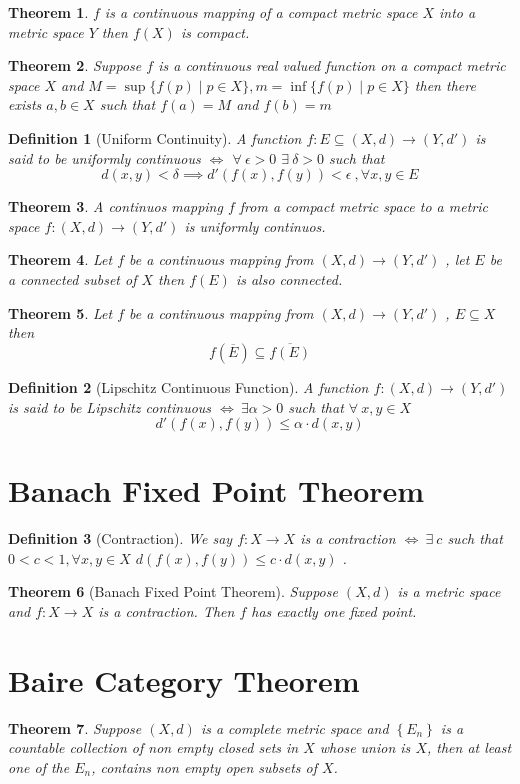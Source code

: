\documentclass{article}
\newcommand{\set}[1]{\left\{#1\right\}}
\newtheorem{theorem}{Theorem}[section]
\newtheorem{defn}{Definition}[section]
\begin{document}
\begin{theorem}
	$f$ is a continuous mapping of a compact metric space $X$ into a metric space $Y$ then $f(X)$ is compact.
\end{theorem}
\begin{theorem}
	Suppose $f$ is a continuous real valued function on a compact metric space $X$ and $M=\sup\{f(p)\mid p\in X\},m=\inf\{f(p)\mid p\in X\}$ then there exists $a,b\in X$ such that $f(a)=M$ and $f(b)=m$
\end{theorem}
\begin{defn}[Uniform Continuity]
	A function $f:E\subseteq(X,d)\to(Y,d')$ is said to be uniformly continuous $\iff$ $\forall \ \epsilon>0$ $\exists \ \delta>0$ such that 
	\[d(x,y)<\delta \implies d'(f(x),f(y))<\epsilon \ ,\forall x,y\in E\]
\end{defn}
\begin{theorem}
	A continuos mapping $f$ from  a compact metric space to a metric space $f:(X,d)\to (Y,d')$ is uniformly continuos.
\end{theorem}
\begin{theorem}
	Let $f$ be a continuous mapping from $(X,d)\to(Y,d')$ , let $E$ be a connected subset of $X$ then $f(E)$ is also connected.
	 
	
\end{theorem}
\begin{theorem}
		Let $f$ be a continuous mapping from $(X,d)\to(Y,d')$ , $E\subseteq X$ then 
		\[f(\overline{E})\subseteq \overline{f(E)}\]
\end{theorem}
\begin{defn}[Lipschitz Continuous Function]
	A function $f:(X,d)\to(Y,d')$ is said to be Lipschitz continuous $\iff\ \exists\alpha>0$ such  that $\forall \ x,y\in X$
	\[d'(f(x),f(y))\leq \alpha \cdot d(x,y)\] 
\end{defn}
\section{Banach Fixed Point Theorem}
\begin{defn}[Contraction]
	We say $f:X\to X$ is a contraction $\iff \ \exists \  c $ such that $ 0<c<1,\forall x,y \in X$ $d(f(x),f(y))\leq c \cdot d(x,y)$ .
\end{defn}
\begin{theorem}[Banach Fixed Point Theorem]
	Suppose $(X,d)$ is a metric space and $f:X\to X$
	is a contraction. Then $f$ has exactly one fixed point.
\end{theorem}
\section{\Large Baire Category Theorem}
\begin{theorem}
	Suppose $(X,d)$ is a complete metric space and $\set{E_n}$ is a countable collection of non empty closed sets in $X$ whose union is $X$, then at least one of the $E_n$, contains non empty open subsets of $X$. 
\end{theorem}
\end{document}
